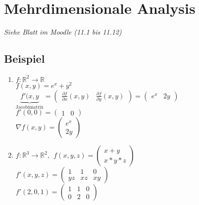  
\section{Mehrdimensionale Analysis}
\hspace*{0.5cm}
\hspace*{1cm}
\emph{Siehe Blatt im Moodle (11.1 bis 11.12)}


\setcounter{subsection}{12}
\subsection{Beispiel}
\begin{enumerate}
	\item
	$f:\mathbb{R}^2\rightarrow\mathbb{R}$\\
	$f(x,y)=e^x+y^2$\\
	$\underbrace{f'(x,y}_{\text{Jacobimatrix}}=\begin{pmatrix}\frac{\partial f}{\partial x}(x,y) & \frac{\partial f}{\partial y}(x,y)\end{pmatrix}= \begin{pmatrix}e^x & 2y\end{pmatrix}$\\
	$f'(0,0)=\begin{pmatrix}1 & 0\end{pmatrix}$\\
	$\nabla f(x,y)=\begin{pmatrix}e^x \\ 2y\end{pmatrix}$
	
	\item
	$f:\mathbb{R}^3\rightarrow \mathbb{R}^2, \ \ f(x,y,z)=\begin{pmatrix}x+y \\ x*y*z\end{pmatrix}$\\
	$f'(x,y,z)=\begin{pmatrix}1 & 1 & 0 \\ yz & xz & xy\end{pmatrix}$\\
	$f'(2,0,1)=\begin{pmatrix}1 & 1 & 0 \\ 0 &  2 & 0 \end{pmatrix}$
\end{enumerate}

